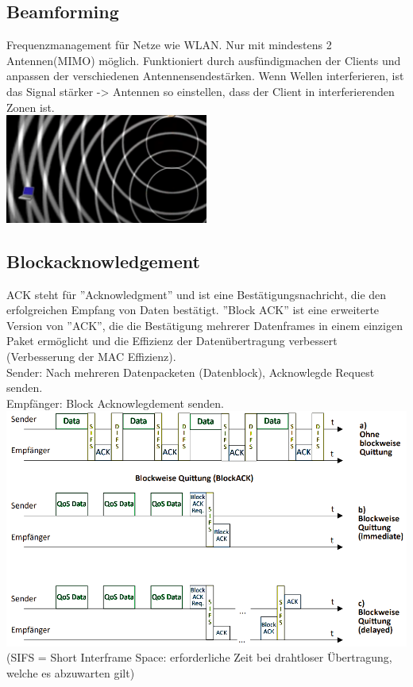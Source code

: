 \documentclass[12pt,a4paper]{article}
\begin{document}
	\subsection{Beamforming}
		Frequenzmanagement für Netze wie WLAN. Nur mit mindestens 2 Antennen(MIMO) möglich. Funktioniert durch ausfündigmachen der Clients und anpassen der verschiedenen Antennensendestärken. Wenn Wellen interferieren, ist das Signal stärker -> Antennen so einstellen, dass der Client in interferierenden Zonen ist.\\
		\includegraphics[width=0.5\textwidth]{Bilder/Beamforming.png}\\

	\subsection{Blockacknowledgement}
		ACK steht für ''Acknowledgment'' und ist eine Bestätigungsnachricht, die den erfolgreichen Empfang von Daten bestätigt. 
		''Block ACK'' ist eine erweiterte Version von ''ACK'', die die Bestätigung mehrerer Datenframes in einem einzigen Paket ermöglicht und die Effizienz der Datenübertragung verbessert (Verbesserung der MAC Effizienz). \\
		Sender: Nach mehreren Datenpacketen (Datenblock), Acknowlegde Request senden. \\
		Empfänger: Block Acknowlegdement senden.\\
		\includegraphics[width=\textwidth]{Bilder/Blockacknowlegdement-removedBg.png}\\
		(SIFS = Short Interframe Space: erforderliche Zeit bei drahtloser Übertragung, welche es abzuwarten gilt)
\end{document}

